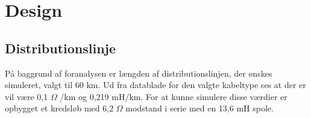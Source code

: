 
\chapter{Design}

\section{Distributionslinje}
På baggrund af foranalysen er længden af distributionslinjen, der ønskes simuleret, valgt til 60 km. Ud fra datablade for den valgte kabeltype ses at der er vil være 0,1 $\Omega$ /km og 0,219 mH/km. For at kunne simulere disse værdier er opbygget et kredsløb med 6,2 $\Omega$ modstand i serie med en 13,6 mH spole. 



